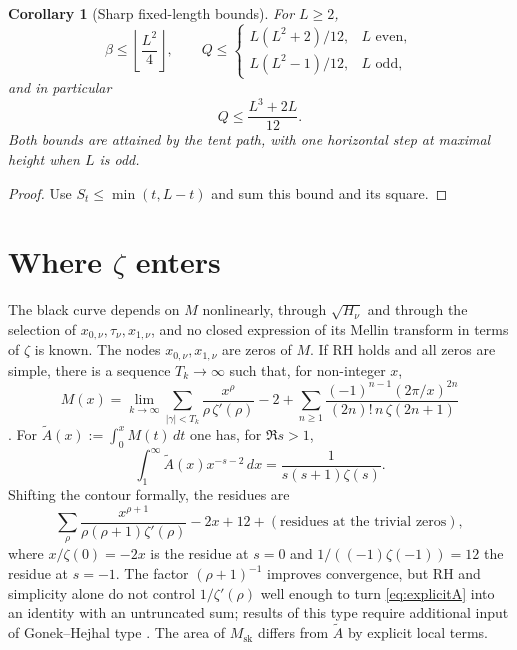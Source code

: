 \documentclass[11pt]{amsart}
\numberwithin{equation}{section}
\theoremstyle{plain}
\newtheorem{corollary}[theorem]{Corollary}
\theoremstyle{definition}
\theoremstyle{remark}
\newcommand{\Msk}{M_{\mathrm{sk}}}
\begin{document}
\begin{corollary}[Sharp fixed-length bounds]
\label{cor:fixed-L}
For $L\ge2$,
\[
\beta\le\left\lfloor\frac{L^2}{4}\right\rfloor,\qquad
Q\le
\begin{cases}
L(L^2+2)/12,&L\text{ even},\\
L(L^2-1)/12,&L\text{ odd},
\end{cases}
\]
and in particular
\begin{equation}
\label{eq:Q_upper}
Q\le\frac{L^3+2L}{12}.
\end{equation}
Both bounds are attained by the tent path, with one horizontal step at
maximal height when $L$ is odd.
\end{corollary}

\begin{proof}
Use $S_t\le\min(t,L-t)$ and sum this bound and its square.
\end{proof}

\section{Where \texorpdfstring{$\zeta$}{zeta} enters}
\label{sec:zeta}

The black curve depends on $M$ nonlinearly, through $\sqrt{H_\nu}$ and
through the selection of $x_{0,\nu},\tau_\nu,x_{1,\nu}$, and no closed
expression of its Mellin transform in terms of $\zeta$ is known. The nodes
$x_{0,\nu},x_{1,\nu}$ are zeros of $M$. If RH holds and all zeros are
simple, there is a sequence $T_k\to\infty$ such that, for non-integer $x$,
\begin{equation}
\label{eq:explicitM}
  M(x)=\lim_{k\to\infty}\sum_{|\gamma|<T_k}\frac{x^\rho}{\rho\,\zeta'(\rho)}-2
  +\sum_{n\ge1}\frac{(-1)^{n-1}(2\pi/x)^{2n}}{(2n)!\,n\,\zeta(2n+1)}
\end{equation}
\cite[\S14.27]{Titchmarsh1986}. For $\widetilde{A}(x):=\int_0^xM(t)\,dt$ one
has, for $\Re s>1$,
\begin{equation}
\label{eq:mellin_A}
  \int_1^\infty \widetilde{A}(x)x^{-s-2}\,dx=\frac{1}{s(s+1)\zeta(s)}.
\end{equation}
Shifting the contour formally, the residues are
\begin{equation}
\label{eq:explicitA}
  \sum_\rho\frac{x^{\rho+1}}{\rho(\rho+1)\zeta'(\rho)}-2x+12
  +(\text{residues at the trivial zeros}),
\end{equation}
where $x/\zeta(0)=-2x$ is the residue at $s=0$ and
$1/((-1)\zeta(-1))=12$ the residue at $s=-1$. The factor $(\rho+1)^{-1}$
improves convergence, but RH and simplicity alone do not control
$1/\zeta'(\rho)$ well enough to turn \eqref{eq:explicitA} into an identity
with an untruncated sum; results of this type require additional input of
Gonek--Hejhal type \cite{Ng2004}. The area of $\Msk$ differs from
$\widetilde A$ by explicit local terms.
\end{document}
